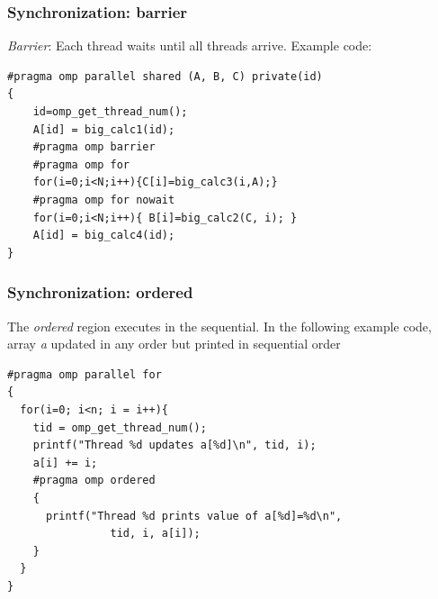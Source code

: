 \documentclass[twoside]{article}
\begin{document}
\subsubsection{Synchronization: barrier}
{\it Barrier}: Each thread waits until all threads arrive. Example code:
\begin{center}
\begin{lstlisting}[linewidth=17cm]
#pragma omp parallel shared (A, B, C) private(id)
{
    id=omp_get_thread_num();
    A[id] = big_calc1(id); 
    #pragma omp barrier 
    #pragma omp for
    for(i=0;i<N;i++){C[i]=big_calc3(i,A);} 
    #pragma omp for nowait
    for(i=0;i<N;i++){ B[i]=big_calc2(C, i); } 
    A[id] = big_calc4(id); 
}
\end{lstlisting}
\end{center}

\subsubsection{Synchronization: ordered}
The {\it ordered} region executes in the sequential. In the following example code, array {\it a} updated in any order but printed in sequential order
\begin{center}
\begin{lstlisting}[linewidth=18cm]
#pragma omp parallel for
{ 
  for(i=0; i<n; i = i++){ 
    tid = omp_get_thread_num();
    printf("Thread %d updates a[%d]\n", tid, i);
    a[i] += i;
    #pragma omp ordered
    {
      printf("Thread %d prints value of a[%d]=%d\n", 
                tid, i, a[i]);
    }
  }
} 

\end{lstlisting}
\end{center}
\end{document}
